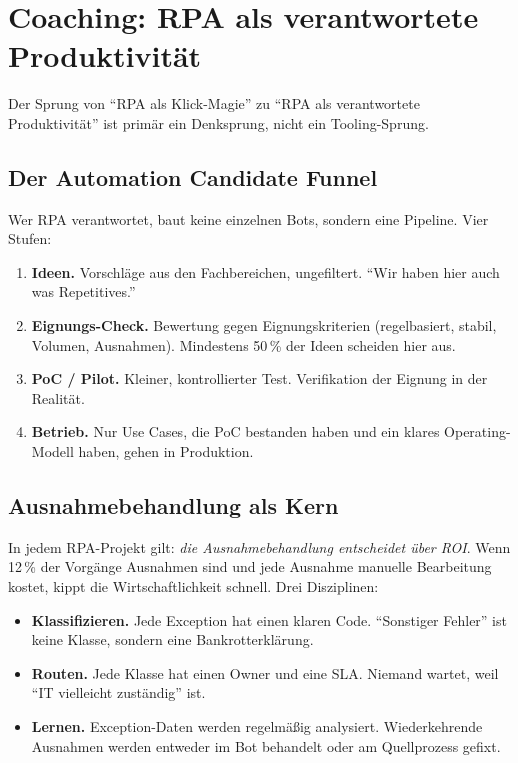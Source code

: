 \documentclass[11pt,a4paper,oneside]{article}
\begin{document}
\section{Coaching: RPA als verantwortete Produktivität}

Der Sprung von ``RPA als Klick-Magie'' zu ``RPA als verantwortete Produktivität'' ist primär ein Denksprung, nicht ein Tooling-Sprung.

\subsection{Der Automation Candidate Funnel}

Wer RPA verantwortet, baut keine einzelnen Bots, sondern eine Pipeline. Vier Stufen:

\begin{enumerate}
  \item \textbf{Ideen.} Vorschläge aus den Fachbereichen, ungefiltert. ``Wir haben hier auch was Repetitives.''
  \item \textbf{Eignungs-Check.} Bewertung gegen Eignungskriterien (regelbasiert, stabil, Volumen, Ausnahmen). Mindestens 50\,\% der Ideen scheiden hier aus.
  \item \textbf{PoC / Pilot.} Kleiner, kontrollierter Test. Verifikation der Eignung in der Realität.
  \item \textbf{Betrieb.} Nur Use Cases, die PoC bestanden haben und ein klares Operating-Modell haben, gehen in Produktion.
\end{enumerate}

\subsection{Ausnahmebehandlung als Kern}

In jedem RPA-Projekt gilt: \emph{die Ausnahmebehandlung entscheidet über ROI}. Wenn 12\,\% der Vorgänge Ausnahmen sind und jede Ausnahme manuelle Bearbeitung kostet, kippt die Wirtschaftlichkeit schnell. Drei Disziplinen:

\begin{itemize}
  \item \textbf{Klassifizieren.} Jede Exception hat einen klaren Code. ``Sonstiger Fehler'' ist keine Klasse, sondern eine Bankrotterklärung.
  \item \textbf{Routen.} Jede Klasse hat einen Owner und eine SLA. Niemand wartet, weil ``IT vielleicht zuständig'' ist.
  \item \textbf{Lernen.} Exception-Daten werden regelmäßig analysiert. Wiederkehrende Ausnahmen werden entweder im Bot behandelt oder am Quellprozess gefixt.
\end{itemize}
\end{document}
